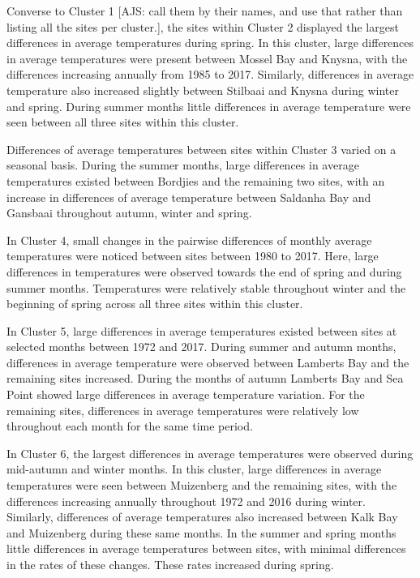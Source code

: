 \documentclass[12pt,a4paper,]{article}
\begin{document}
Converse to Cluster 1 {[}AJS: call them by their names, and use that
rather than listing all the sites per cluster.{]}, the sites within
Cluster 2 displayed the largest differences in average temperatures
during spring. In this cluster, large differences in average
temperatures were present between Mossel Bay and Knysna, with the
differences increasing annually from 1985 to 2017. Similarly,
differences in average temperature also increased slightly between
Stilbaai and Knysna during winter and spring. During summer months
little differences in average temperature were seen between all three
sites within this cluster.

Differences of average temperatures between sites within Cluster 3
varied on a seasonal basis. During the summer months, large differences
in average temperatures existed between Bordjies and the remaining two
sites, with an increase in differences of average temperature between
Saldanha Bay and Gansbaai throughout autumn, winter and spring.

In Cluster 4, small changes in the pairwise differences of monthly
average temperatures were noticed between sites between 1980 to 2017.
Here, large differences in temperatures were observed towards the end of
spring and during summer months. Temperatures were relatively stable
throughout winter and the beginning of spring across all three sites
within this cluster.

In Cluster 5, large differences in average temperatures existed between
sites at selected months between 1972 and 2017. During summer and autumn
months, differences in average temperature were observed between
Lamberts Bay and the remaining sites increased. During the months of
autumn Lamberts Bay and Sea Point showed large differences in average
temperature variation. For the remaining sites, differences in average
temperatures were relatively low throughout each month for the same time
period.

In Cluster 6, the largest differences in average temperatures were
observed during mid-autumn and winter months. In this cluster, large
differences in average temperatures were seen between Muizenberg and the
remaining sites, with the differences increasing annually throughout
1972 and 2016 during winter. Similarly, differences of average
temperatures also increased between Kalk Bay and Muizenberg during these
same months. In the summer and spring months little differences in
average temperatures between sites, with minimal differences in the
rates of these changes. These rates increased during spring.
\end{document}
